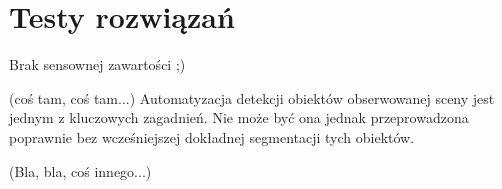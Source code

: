 \chapter{Testy rozwiązań}
\label{ch:testy}

Brak sensownej zawartości ;)


(coś tam, coś tam...) Automatyzacja detekcji obiektów obserwowanej sceny jest jednym z kluczowych zagadnień. Nie może być ona jednak przeprowadzona poprawnie bez wcześniejszej dokładnej segmentacji tych obiektów.

(Bla, bla, coś innego...)



